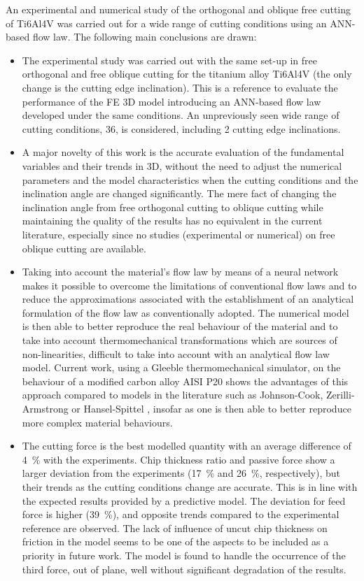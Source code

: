 \documentclass[preprint,12pt,times]{elsarticle}
\begin{document}
An experimental and numerical study of the orthogonal and oblique free cutting of Ti6Al4V was carried out for a wide range of cutting conditions using an ANN-based flow law. The following main conclusions are drawn:
\begin{itemize}
  \item The experimental study was carried out with the same set-up in free orthogonal and free oblique cutting for the titanium alloy Ti6Al4V (the only change is the cutting edge inclination). This is a reference to evaluate the performance of the FE 3D model introducing an ANN-based flow law developed under the same conditions. An unpreviously seen wide range of cutting conditions, 36, is considered, including 2 cutting edge inclinations.
  \item A major novelty of this work is the accurate evaluation of the fundamental variables and their trends in 3D, without the need to adjust the numerical parameters and the model characteristics when the cutting conditions and the inclination angle are changed significantly. The mere fact of changing the inclination angle from free orthogonal cutting to oblique cutting while maintaining the quality of the results has no equivalent in the current literature, especially since no studies (experimental or numerical) on free oblique cutting are available.
  \item Taking into account the material's flow law by means of a neural network makes it possible to overcome the limitations of conventional flow laws and to reduce the approximations associated with the establishment of an analytical formulation of the flow law as conventionally adopted. The numerical model is then able to better reproduce the real behaviour of the material and to take into account thermomechanical transformations which are sources of non-linearities, difficult to take into account with an analytical flow law model. Current work, using a Gleeble thermomechanical simulator, on the behaviour of a modified carbon alloy AISI P20 shows the advantages of this approach compared to models in the literature such as Johnson-Cook, Zerilli-Armstrong \cite{gurusamy_Performance_2017} or Hansel-Spittel \cite{chadha_Approach_2018}, insofar as one is then able to better reproduce more complex material behaviours.
  \item The cutting force is the best modelled quantity with an average difference of \qty{4}{\%} with the experiments. Chip thickness ratio and passive force show a larger deviation from the experiments (\qty{17}{\%} and \qty{26}{\%}, respectively), but their trends as the cutting conditions change are accurate. This is in line with the expected results provided by a predictive model. The deviation for feed force is higher (\qty{39}{\%}), and opposite trends compared to the experimental reference are observed. The lack of influence of uncut chip thickness on friction in the model seems to be one of the aspects to be included as a priority in future work. The model is found to handle the occurrence of the third force, out of plane, well without significant degradation of the results.

\end{itemize}
\end{document}
